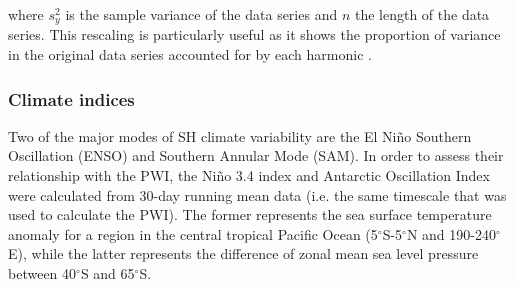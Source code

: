 \noindent where $s_y^2$ is the sample variance of the data series and $n$ the length of the data series. This rescaling is particularly useful as it shows the proportion of variance in the original data series accounted for by each harmonic \citep{Wilks2011}.

\subsubsection{Climate indices}
Two of the major modes of SH climate variability are the El Ni\~{n}o Southern Oscillation (ENSO) and Southern Annular Mode (SAM). In order to assess their relationship with the PWI, the Ni\~{n}o 3.4 index \citep{Trenberth2001} and Antarctic Oscillation Index \citep[AOI;][]{Gong1999} were calculated from 30-day running mean data (i.e. the same timescale that was used to calculate the PWI). The former represents the sea surface temperature anomaly for a region in the central tropical Pacific Ocean (5$^{\circ}$S-5$^{\circ}$N and 190-240$^{\circ}$E), while the latter represents the difference of zonal mean sea level pressure between 40$^{\circ}$S and 65$^{\circ}$S. 

